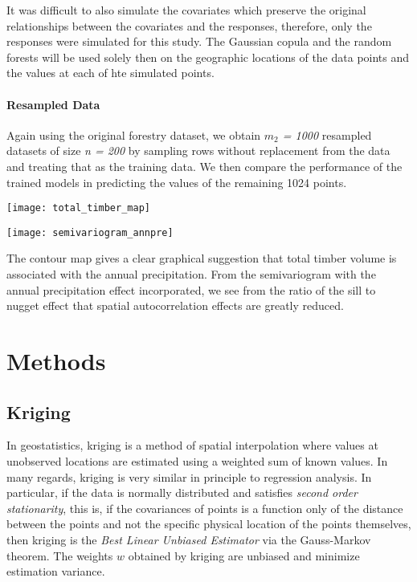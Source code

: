 \documentclass{article}
\begin{document}
It was difficult to also simulate the covariates which preserve the original relationships between the covariates and the responses, therefore, only the responses were simulated for this study.
The Gaussian copula and the random forests will be used solely then on the geographic locations of the data points and the values at each of hte simulated points.

\paragraph{Resampled Data} Again using the original forestry dataset, we obtain \textit{$m_2$ = 1000} resampled datasets of size \textit{n = 200} by sampling rows without replacement from the data and treating that as the training data.
We then compare the performance of the trained models in predicting the values of the remaining 1024 points.
\vspace{.5cm}

\begin{minipage}[t]{.45\textwidth}
\texttt{[image: total\_timber\_map]}
\end{minipage}
\begin{minipage}[t]{.45\textwidth}
\texttt{[image: semivariogram\_annpre]}
\end{minipage}

The contour map gives a clear graphical suggestion that total timber volume is associated with the annual precipitation.
From the semivariogram with the annual precipitation effect incorporated, we see from the ratio of the sill to nugget effect that spatial autocorrelation effects are greatly reduced.

\section{Methods}

\subsection{Kriging}
In geostatistics, kriging is a method of spatial interpolation where values at unobserved locations are estimated using a weighted sum of known values.
In many regards, kriging is very similar in principle to regression analysis.
In particular, if the data is normally distributed and satisfies \textit{second order stationarity}, this is, if the covariances of points is a function only of the distance between the points and not the specific physical location of the points themselves, then kriging is the \textit{Best Linear Unbiased Estimator} via the Gauss-Markov theorem.
The weights $w$ obtained by kriging are unbiased and minimize estimation variance.
\end{document}
